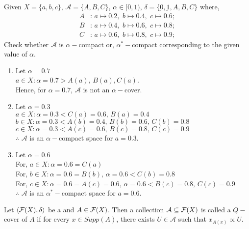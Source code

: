 \documentclass[../main-sheet.tex]{subfiles}
\begin{document}
\begin{ex}
    Given \(X=\{a,b,c \}\), \(\mathcal{A }=\{A,B,C\}\), \(\alpha\in[0,1)\), \(\delta=\{\underbar{0},\underbar{1},A,B,C \}\) where,
    \begin{align*}
        A&:\,a\mapsto 0.2,\,\,b\mapsto 0.4,\,\,c\mapsto0.6;\\
        B&:\,a\mapsto 0.4,\,\,b\mapsto 0.6,\,\,c\mapsto0.8;\\
        C&:\,a\mapsto 0.6,\,\,b\mapsto 0.8,\,\,c\mapsto0.9;
    \end{align*}
    Check whether \(\mathcal{A }\) is \(\alpha-\)compact or, \(\alpha^*-\)compact corresponding to the given value of \(\alpha\).
\end{ex}
\begin{soln}\hfill
    \begin{enumerate}
        \item Let \(\alpha=0.7\)\\
        \(a\in X :\alpha=0.7> A(a),\,B(a),C(a)\).\\
        Hence, for \(\alpha=0.7\), \(\mathcal{A }\) is not an \(\alpha-\)cover.
        \item Let \(\alpha=0.3\)\\
        \(a\in X :\alpha=0.3< C(a)=0.6,\,B(a)=0.4\)\\
        \(b\in X :\alpha=0.3< A(b)=0.4,\,B(b)=0.6,\,C(b)=0.8\)\\
        \(c\in X :\alpha=0.3< A(c)=0.6,\,B(c)=0.8,\,C(c)=0.9\)\\
        \(\therefore \) \(\mathcal{A }\) is an \(\alpha-\)compact space for \(a=0.3\).
        \item Let \(\alpha=0.6\)\\
        For, \(a\in X :\alpha=0.6=C(a)\)\\
        For, \(b\in X :\alpha=0.6= B(b),\,\alpha=0.6<C(b)=0.8\)\\
        For, \(c\in X :\alpha=0.6= A(c)=0.6,\,\alpha=0.6< B(c)=0.8,\,C(c)=0.9\)\\
        \(\therefore \) \(\mathcal{A }\) is an \(\alpha^*-\)compact space for \(a=0.6\).
    \end{enumerate}
\end{soln}
\begin{defn}[\(Q-\)cover]
    Let \(\langle \mathcal{F}(X), \delta \rangle\) be a \fts\s and \(A\in\mathcal{F}(X)\). Then a collection \(\mathcal{A }\subseteq \mathcal{F}(X)\) is called a \(Q-\)cover of \(A\) if for every \(x\in Supp(A )\), there exists \(U\in \mathcal{A }\) such that \(x_{A(x )}\propto U \).
\end{defn}
\end{document}

